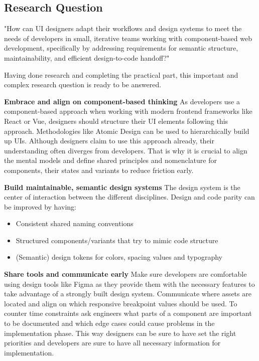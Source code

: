 \newpage
\subsection{Research Question}
"How can UI designers adapt their workflows and design systems to meet the needs of developers in
small, iterative teams working with component-based web development, specifically by addressing
requirements for semantic structure, maintainability, and efficient design-to-code handoff?"

Having done research and completing the practical part, this important and complex research question
is ready to be answered.

\textbf{Embrace and align on component-based thinking}
As developers use a component-based approach when working with modern frontend frameworks like React
or Vue, designers should structure their UI elements following this approach. Methodologies like
Atomic Design can be used to hierarchically build up UIs. Although designers claim to use this
approach already, their understanding often diverges from developers. That is why it is crucial to
align the mental models and define shared principles and nomenclature for components, their states
and variants to reduce friction early.

\textbf{Build maintainable, semantic design systems}
The design system is the center of interaction between the different disciplines. Design and code
parity can be improved by having:
\begin{itemize}
    \item Consistent shared naming conventions
    \item Structured components/variants that try to mimic code structure
    \item (Semantic) design tokens for colors, spacing values and typography
\end{itemize}

\textbf{Share tools and communicate early}
Make sure developers are comfortable using design tools like Figma as they provide them with the
necessary features to take advantage of a strongly built design system. Communicate where assets are
located and align on which responsive breakpoint values should be used. To counter time constraints
ask engineers what parts of a component are important to be documented and which edge cases could
cause problems in the implementation phase. This way designers can be sure to have set the right
priorities and developers are sure to have all necessary information for implementation.

